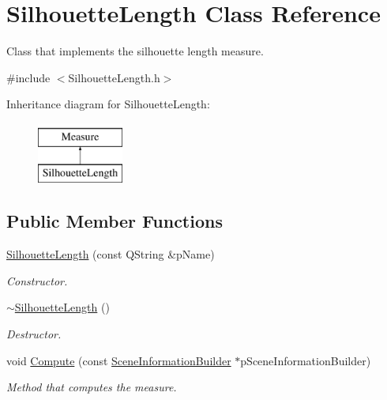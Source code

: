 \hypertarget{class_silhouette_length}{\section{Silhouette\+Length Class Reference}
\label{class_silhouette_length}
}


Class that implements the silhouette length measure.  




{\ttfamily \#include $<$Silhouette\+Length.\+h$>$}

Inheritance diagram for Silhouette\+Length\+:\begin{figure}[H]
\begin{center}
\leavevmode
\includegraphics[height=2.000000cm]{class_silhouette_length}
\end{center}
\end{figure}
\subsection*{Public Member Functions}
\begin{DoxyCompactItemize}
\item 
\hyperlink{class_silhouette_length_ae194067fadc71a33f86be3f1f5b3cd7e}{Silhouette\+Length} (const Q\+String \&p\+Name)
\begin{DoxyCompactList}\small\item\em Constructor. \end{DoxyCompactList}\item 
\hyperlink{class_silhouette_length_a7eb68a8046a6558521cb7da0b3d97989}{$\sim$\+Silhouette\+Length} ()
\begin{DoxyCompactList}\small\item\em Destructor. \end{DoxyCompactList}\item 
void \hyperlink{class_silhouette_length_a63222bec0b229689a01a1faf010448cc}{Compute} (const \hyperlink{class_scene_information_builder}{Scene\+Information\+Builder} $\ast$p\+Scene\+Information\+Builder)
\begin{DoxyCompactList}\small\item\em Method that computes the measure. \end{DoxyCompactList}\end{DoxyCompactItemize}
